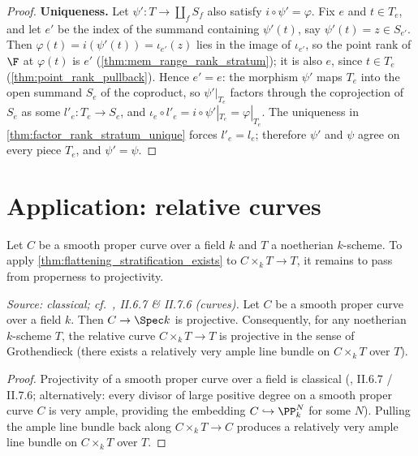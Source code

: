 \begin{proof}
  \textbf{Uniqueness.}  Let \(\psi' : T \to \coprod_f S_f\) also satisfy
  \(i \circ \psi' = \varphi\).  Fix \(e\) and \(t \in T_e\), and let
  \(e'\) be the index of the summand containing \(\psi'(t)\), say
  \(\psi'(t) = z \in S_{e'}\).  Then
  \(\varphi(t) = i(\psi'(t)) = \iota_{e'}(z)\) lies in the image of
  \(\iota_{e'}\), so the point rank of \(\F\) at \(\varphi(t)\) is \(e'\)
  (\cref{thm:mem_range_rank_stratum}); it is also \(e\), since
  \(t \in T_e\) (\cref{thm:point_rank_pullback}).  Hence \(e' = e\): the
  morphism \(\psi'\) maps \(T_e\) into the open summand \(S_e\) of the
  coproduct, so \(\psi'|_{T_e}\) factors through the coprojection of
  \(S_e\) as some \(l'_e : T_e \to S_e\), and
  \(\iota_e \circ l'_e = i \circ \psi'|_{T_e} = \varphi|_{T_e}\).  The
  uniqueness in \cref{thm:factor_rank_stratum_unique} forces
  \(l'_e = l_e\); therefore \(\psi'\) and \(\psi\) agree on every piece
  \(T_e\), and \(\psi' = \psi\).
\end{proof}

\section{Application: relative curves}
\label{sec:flatstrat_curve_application}

Let \(C\) be a smooth proper curve over a field \(k\) and \(T\) a noetherian
\(k\)-scheme.  To apply \cref{thm:flattening_stratification_exists} to
\(C \times_k T \to T\), it remains to pass from properness to projectivity.

\begin{lemma}
  \label{lem:smooth_proper_curve_projective}
  \textit{Source: classical; cf.\ \cite{hartshorne-ag}, II.6.7 \& II.7.6 (curves).}
  Let \(C\) be a smooth proper curve over a field \(k\).  Then \(C \to \Spec k\) is
  projective.  Consequently, for any noetherian \(k\)-scheme \(T\), the relative
  curve \(C \times_k T \to T\) is projective in the sense of Grothendieck (there
  exists a relatively very ample line bundle on \(C \times_k T\) over \(T\)).
\end{lemma}

\begin{proof}
  Projectivity of a smooth proper curve over a field is classical
  (\cite{hartshorne-ag}, II.6.7 / II.7.6; alternatively: every divisor of large
  positive degree on a smooth proper curve \(C\) is very ample, providing the
  embedding \(C \hookrightarrow \PP^N_k\) for some \(N\)). Pulling the ample line
  bundle back along \(C \times_k T \to C\) produces a relatively very ample line
  bundle on \(C \times_k T\) over \(T\).
\end{proof}

